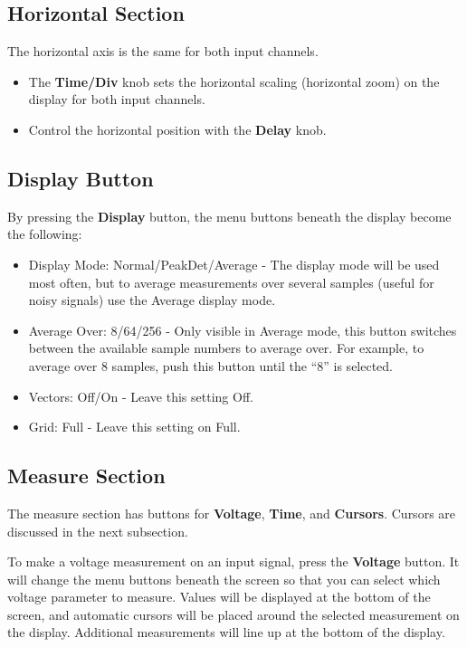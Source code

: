 \documentclass{article}
\begin{document}
\subsection{Horizontal Section}
The horizontal axis is the same for both input channels.
\begin{itemize}
\item The \textbf{Time/Div} knob sets the horizontal scaling (horizontal zoom) on the display for both input channels. 
\item Control the horizontal position with the \textbf{Delay} knob.
\end{itemize}

\subsection{Display Button}
By pressing the \textbf{Display} button, the menu buttons beneath the display become the following:
\begin{itemize}
\item Display Mode: Normal/PeakDet/Average  -  The display mode will be used most often, but to average measurements over several samples (useful for noisy signals) use the Average display mode.
\item Average Over: 8/64/256  -  Only visible in Average mode, this button switches between the available sample numbers to average over. For example, to average over 8 samples, push this button until the ``8'' is selected.
\item Vectors: Off/On  -  Leave this setting Off.
\item Grid: Full  -  Leave this setting on Full.
\end{itemize}

\subsection{Measure Section}
The measure section has buttons for \textbf{Voltage}, \textbf{Time}, and \textbf{Cursors}. Cursors are discussed in the next subsection.

To make a voltage measurement on an input signal, press the \textbf{Voltage} button. It will change the menu buttons beneath the screen so that you can select which voltage parameter to measure. Values will be displayed at the bottom of the screen, and automatic cursors will be placed around the selected measurement on the display. Additional measurements will line up at the bottom of the display.
\end{document}

